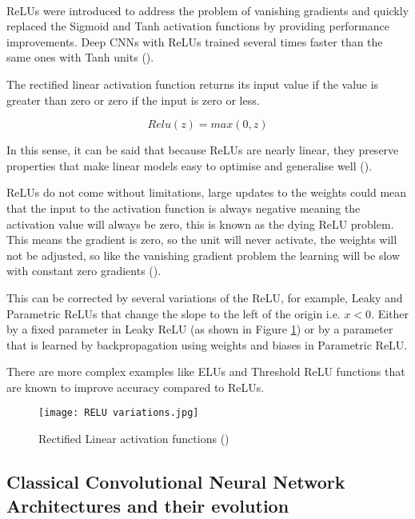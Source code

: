 \paragraph{}
\gls{ReLU}s were introduced to address the problem of vanishing gradients and quickly replaced the Sigmoid and Tanh activation functions by providing performance improvements. Deep \gls{CNN}s with \gls{ReLU}s trained several times faster than the same ones with Tanh units (\cite{GoodBengCour16}).

The rectified linear activation function returns its input value if the value is greater than zero or zero if the input is zero or less.

\begin{equation}
    \label{eq_relu}
    Relu(z) = max(0, z)
\end{equation}

In this sense, it can be said that because \gls{ReLU}s are nearly linear, they preserve properties that make linear models easy to optimise and generalise well (\cite{GoodBengCour16}).

\gls{ReLU}s do not come without limitations, large updates to the weights could mean that the input to the activation function is always negative meaning the activation value will always be zero, this is known as the dying \gls{ReLU} problem. This means the gradient is zero, so the unit will never activate, the weights will not be adjusted, so like the vanishing gradient problem the learning will be slow with constant zero gradients (\cite{Maas13rectifiernonlinearities}).

This can be corrected by several variations of the \gls{ReLU}, for example, Leaky and Parametric \gls{ReLU}s that change the slope to the left of the origin \gls{i.e.} $x < 0$. Either by a fixed parameter in Leaky \gls{ReLU} (as shown in Figure \ref{fig_relu}) or by a parameter that is learned by backpropagation using weights and biases in Parametric \gls{ReLU}. 

There are more complex examples like \gls{ELU}s and Threshold \gls{ReLU} functions that are known to improve accuracy compared to \gls{ReLU}s.

\begin{figure}[hbt!]
        \centering
        \texttt{[image: RELU variations.jpg]}
        \caption{Rectified Linear activation functions (\cite{leakyreluimg})}
        \label{fig_relu}
\end{figure}

\subsection{Classical Convolutional Neural Network Architectures and their evolution} \label{classic_cnn}
